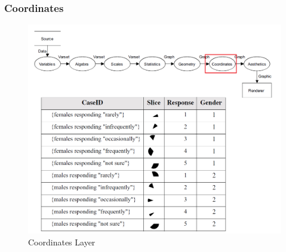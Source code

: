 \documentclass[12pt]{article}
\begin{document}
\subsubsection{Coordinates}
\begin{figure}[h!]
\caption{Coordinates Layer}
\includegraphics[width=\textwidth]{pic/pre6}
\end{figure}
\newpage
\end{document}
